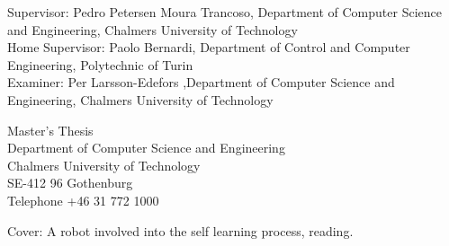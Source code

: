 \newpage
\thispagestyle{empty}
\vspace*{4.5cm}


Supervisor: Pedro Petersen Moura Trancoso, Department of Computer Science and Engineering, Chalmers University of Technology \\
Home Supervisor: Paolo Bernardi,  Department of Control and Computer Engineering, Polytechnic of Turin \\
Examiner: Per Larsson-Edefors ,Department of Computer Science and Engineering, Chalmers University of Technology  \setlength{\parskip}{1cm}

Master's Thesis \the\year\\	%
Department of Computer Science and Engineering\\
Chalmers University of Technology\\
SE-412 96 Gothenburg\\
Telephone +46 31 772 1000 \setlength{\parskip}{0.5cm}

\vfill
Cover: A robot involved into the self learning process, reading.



